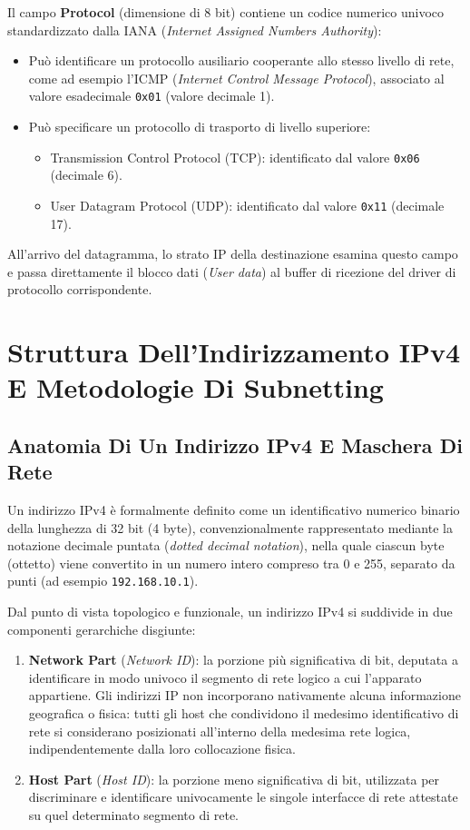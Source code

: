\documentclass[11pt, a4paper]{article}
\begin{document}
Il campo \textbf{Protocol} (dimensione di 8 bit) contiene un codice numerico univoco standardizzato dalla IANA (\emph{Internet Assigned Numbers Authority}):
\begin{itemize}
    \item Può identificare un protocollo ausiliario cooperante allo stesso livello di rete, come ad esempio l'ICMP (\emph{Internet Control Message Protocol}), associato al valore esadecimale \texttt{0x01} (valore decimale 1).
    \item Può specificare un protocollo di trasporto di livello superiore:
    \begin{itemize}
        \item Transmission Control Protocol (TCP): identificato dal valore \texttt{0x06} (decimale 6).
        \item User Datagram Protocol (UDP): identificato dal valore \texttt{0x11} (decimale 17).
    \end{itemize}
\end{itemize}
All'arrivo del datagramma, lo strato IP della destinazione esamina questo campo e passa direttamente il blocco dati (\emph{User data}) al buffer di ricezione del driver di protocollo corrispondente.

\newpage
\section{Struttura Dell'Indirizzamento IPv4 E Metodologie Di Subnetting}

\subsection{Anatomia Di Un Indirizzo IPv4 E Maschera Di Rete}
Un indirizzo IPv4 è formalmente definito come un identificativo numerico binario della lunghezza di 32 bit (4 byte), convenzionalmente rappresentato mediante la notazione decimale puntata (\emph{dotted decimal notation}), nella quale ciascun byte (ottetto) viene convertito in un numero intero compreso tra 0 e 255, separato da punti (ad esempio \texttt{192.168.10.1}).

Dal punto di vista topologico e funzionale, un indirizzo IPv4 si suddivide in due componenti gerarchiche disgiunte:
\begin{enumerate}
    \item \textbf{Network Part} (\emph{Network ID}): la porzione più significativa di bit, deputata a identificare in modo univoco il segmento di rete logico a cui l'apparato appartiene. Gli indirizzi IP non incorporano nativamente alcuna informazione geografica o fisica: tutti gli host che condividono il medesimo identificativo di rete si considerano posizionati all'interno della medesima rete logica, indipendentemente dalla loro collocazione fisica.
    \item \textbf{Host Part} (\emph{Host ID}): la porzione meno significativa di bit, utilizzata per discriminare e identificare univocamente le singole interfacce di rete attestate su quel determinato segmento di rete.
\end{enumerate}
\end{document}
